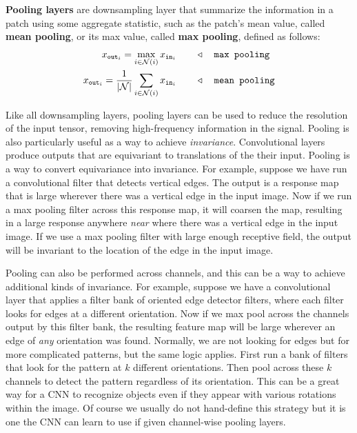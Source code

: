 {\bf Pooling layers} are downsampling layer that summarize the information in a patch using some aggregate statistic, such as the patch's mean value, called {\bf mean pooling}, or its max value, called {\bf max pooling}, defined as follows:
\begin{align}
    x_{\texttt{out}_i} = \max_{i \in \mathcal{N}(i)} x_{\texttt{in}_i} & \quad\quad \triangleleft \quad \texttt{max pooling}\label{eqn:convolutional_neural_nets:max_pooling}\\
    x_{\texttt{out}_i} = \frac{1}{|\mathcal{N}|} \sum_{i \in \mathcal{N}(i)} x_{\texttt{in}_i} & \quad\quad \triangleleft \quad \texttt{mean pooling}\label{eqn:convolutional_neural_nets:mean_pooling}
\end{align}

Like all downsampling layers, pooling layers can be used to reduce the resolution of the input tensor, removing high-frequency information in the signal. Pooling is also particularly useful as a way to achieve \textit{invariance}. Convolutional layers produce outputs that are equivariant to translations of the their input. Pooling is a way to convert equivariance into invariance. For example, suppose we have run a convolutional filter that detects vertical edges. The output is a response map that is large wherever there was a vertical edge in the input image. Now if we run a max pooling filter across this response map, it will coarsen the map, resulting in a large response anywhere \textit{near} where there was a vertical edge in the input image. If we use a max pooling filter with large enough receptive field, the output will be invariant to the location of the edge in the input image.

Pooling can also be performed across channels, and this can be a way to achieve additional kinds of invariance. For example, suppose we have a convolutional layer that applies a filter bank of oriented edge detector filters, where each filter looks for edges at a different orientation. Now if we max pool across the channels output by this filter bank, the resulting feature map will be large wherever an edge of \textit{any} orientation was found. Normally, we are not looking for edges but for more complicated patterns, but the same logic applies. First run a bank of filters that look for the pattern at $k$ different orientations. Then pool across these $k$ channels to detect the pattern regardless of its orientation. This can be a great way for a CNN to recognize objects even if they appear with various rotations within the image. Of course we usually do not hand-define this strategy but it is one the CNN can learn to use if given channel-wise pooling layers.


